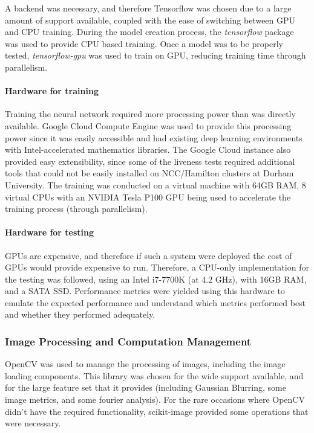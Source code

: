 \documentclass[12pt,a4paper]{article}
\begin{document}
            A backend was necessary, and therefore Tensorflow was chosen due to a large amount of support available, coupled with the ease of switching between GPU and CPU training. During the model creation process, the \emph{tensorflow} package was used to provide CPU based training. Once a model was to be properly tested, \emph{tensorflow-gpu} was used to train on GPU, reducing training time through parallelism.  

            \paragraph{Hardware for training}
            Training the neural network required more processing power than was directly available. Google Cloud Compute Engine was used to provide this processing power since it was easily accessible and had existing deep learning environments with Intel-accelerated mathematics libraries. 
            The Google Cloud instance also provided easy extensibility, since some of the liveness tests required additional tools that could not be easily installed on NCC/Hamilton clusters at Durham University. The training was conducted on a virtual machine with 64GB RAM, 8 virtual CPUs
            with an NVIDIA Tesla P100 GPU being used to accelerate the training process (through parallelism).

            \paragraph{Hardware for testing}
            GPUs are expensive, and therefore if such a system were deployed the cost of GPUs would provide expensive to run. Therefore, a CPU-only implementation for the testing was followed, using an Intel i7-7700K (at 4.2 GHz), with 16GB RAM, and a SATA SSD. Performance metrics were yielded using this hardware to emulate the expected performance and understand which metrics performed best and whether they performed adequately.

        \subsubsection{Image Processing and Computation Management}
            OpenCV was used to manage the processing of images, including the image loading components. This library was chosen for the wide support available, and for the large feature set that it provides (including Gaussian Blurring, some image metrics, and some fourier analysis).
            For the rare occasions where OpenCV didn't have the required functionality, scikit-image provided some operations that were necessary.
            
\end{document}
